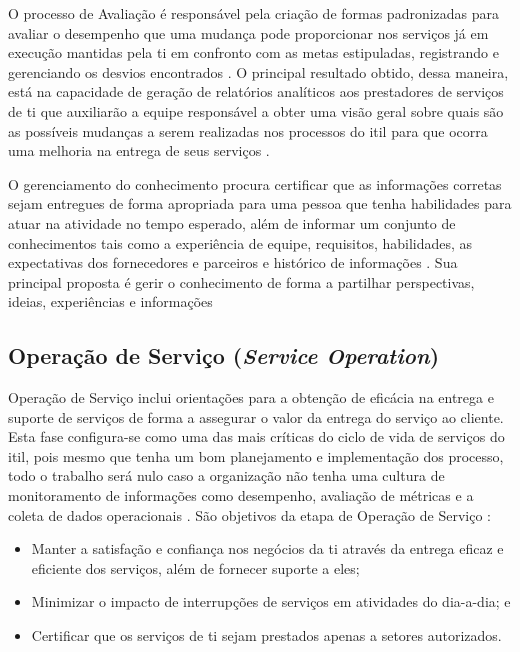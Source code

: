 O processo de Avaliação é responsável pela criação de formas padronizadas para  avaliar o desempenho que uma mudança pode proporcionar nos serviços já em execução mantidas pela \acrshort{ti} em confronto com as metas estipuladas, registrando e gerenciando os desvios encontrados \cite{abreu2012implantando}. O principal resultado obtido, dessa maneira, está na capacidade de geração de relatórios analíticos aos prestadores de serviços de \acrshort{ti} que auxiliarão a equipe responsável a obter uma visão geral sobre quais são as possíveis mudanças a serem realizadas nos processos do \acrshort{itil} para que ocorra uma melhoria na entrega de seus serviços \cite{introductoryoverviewofitil}.

O gerenciamento do conhecimento procura certificar que as informações corretas sejam entregues de forma apropriada para uma pessoa que tenha habilidades para atuar na atividade no tempo esperado, além de informar um conjunto de conhecimentos tais como a experiência de equipe, requisitos, habilidades, as expectativas dos fornecedores e parceiros e histórico de informações \cite{abreu2012implantando}. Sua principal proposta é gerir o conhecimento de forma a partilhar perspectivas, ideias, experiências e informações \cite{introductoryoverviewofitil}

\subsection*{Operação de Serviço (\textit{Service Operation})}

\noindent Operação de Serviço inclui orientações para a obtenção de eficácia na entrega e suporte de serviços de forma a assegurar o valor da entrega do serviço ao cliente. Esta fase configura-se como uma das mais críticas do ciclo de vida de serviços do \acrshort{itil}, pois mesmo que tenha um bom planejamento e implementação dos processo, todo o trabalho será nulo caso a organização não tenha uma cultura de monitoramento de informações como desempenho, avaliação de métricas e a coleta de dados operacionais \cite{serviceoperation, itilimplementationfailure}. São objetivos da etapa de Operação de Serviço \cite{serviceoperation}:

\begin{itemize}
    \item Manter a satisfação e confiança nos negócios da \acrshort{ti} através da entrega eficaz e eficiente dos serviços, além de fornecer suporte a eles;
    \item Minimizar o impacto de interrupções de serviços em atividades do dia-a-dia; e
    \item Certificar que os serviços de \acrshort{ti} sejam prestados apenas a setores autorizados.
\end{itemize}

